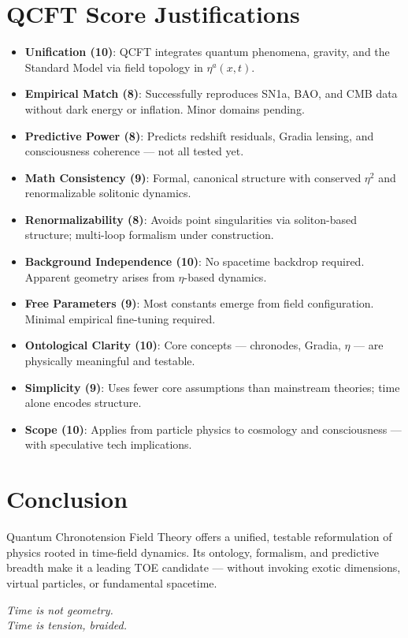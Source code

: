 \documentclass[12pt]{article}
\begin{document}
\section{QCFT Score Justifications}

\begin{itemize}
\item \textbf{Unification (10)}: QCFT integrates quantum phenomena, gravity, and the Standard Model via field topology in $\eta^a(x,t)$.
\item \textbf{Empirical Match (8)}: Successfully reproduces SN1a, BAO, and CMB data without dark energy or inflation. Minor domains pending.
\item \textbf{Predictive Power (8)}: Predicts redshift residuals, Gradia lensing, and consciousness coherence — not all tested yet.
\item \textbf{Math Consistency (9)}: Formal, canonical structure with conserved $\eta^2$ and renormalizable solitonic dynamics.
\item \textbf{Renormalizability (8)}: Avoids point singularities via soliton-based structure; multi-loop formalism under construction.
\item \textbf{Background Independence (10)}: No spacetime backdrop required. Apparent geometry arises from $\eta$-based dynamics.
\item \textbf{Free Parameters (9)}: Most constants emerge from field configuration. Minimal empirical fine-tuning required.
\item \textbf{Ontological Clarity (10)}: Core concepts — chronodes, Gradia, $\eta$ — are physically meaningful and testable.
\item \textbf{Simplicity (9)}: Uses fewer core assumptions than mainstream theories; time alone encodes structure.
\item \textbf{Scope (10)}: Applies from particle physics to cosmology and consciousness — with speculative tech implications.
\end{itemize}

\section*{Conclusion}

Quantum Chronotension Field Theory offers a unified, testable reformulation of physics rooted in time-field dynamics. Its ontology, formalism, and predictive breadth make it a leading TOE candidate — without invoking exotic dimensions, virtual particles, or fundamental spacetime.

\begin{center}
\textit{Time is not geometry.\\Time is tension, braided.}
\end{center}
\end{document}
